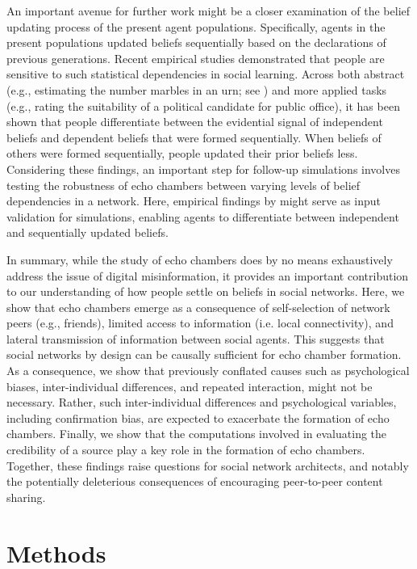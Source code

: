 \documentclass[fleqn,10pt]{wlscirep}
\begin{document}
An important avenue for further work might be a closer examination of the belief updating process of the present agent populations. Specifically, agents in the present populations updated beliefs sequentially based on the declarations of previous generations. Recent empirical studies demonstrated that people are sensitive to such statistical dependencies in social learning. Across both abstract (e.g., estimating the number marbles in an urn; see \cite{whalen2018sensitivity}) and more applied tasks (e.g., rating the suitability of a political candidate for public office), it has been shown that people differentiate between the evidential signal of independent beliefs and dependent beliefs that were formed sequentially. When beliefs of others were formed sequentially, people updated their prior beliefs less. Considering these findings, an important step for follow-up simulations involves testing the robustness of echo chambers between varying levels of belief dependencies in a network. Here, empirical findings by \cite{whalen2018sensitivity} might serve as input validation for simulations, enabling agents to differentiate between independent and sequentially updated beliefs. 

In summary, while the study of echo chambers does by no means exhaustively address the issue of digital misinformation, it provides an important contribution to our understanding of how people settle on beliefs in social networks. Here, we show that echo chambers emerge as a consequence of self-selection of network peers (e.g., friends), limited access to information (i.e. local connectivity), and lateral transmission of information between social agents. This suggests that social networks by design can be causally sufficient for echo chamber formation. As a consequence, we show that previously conflated causes such as psychological biases, inter-individual differences, and repeated interaction, might not be necessary. Rather, such inter-individual differences and psychological variables, including confirmation bias, are expected to exacerbate the formation of echo chambers. Finally, we show that the computations involved in evaluating the credibility of a source play a key role in the formation of echo chambers. Together, these findings raise questions for social network architects, and notably the potentially deleterious consequences of encouraging peer-to-peer content sharing.


\section*{Methods}
\end{document}
